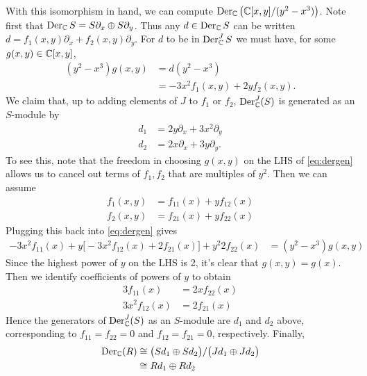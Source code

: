 \begin{example}
    With this isomorphism in hand, we can compute $\operatorname{Der}_{\mathbb{C}}\left( \mathbb{C}[x,y]/(y^2-x^3) \right)$.
    Note first that $\operatorname{Der}_{\mathbb{C}} S=S\partial_x\oplus S\partial_y$.
    Thus any $d\in\operatorname{Der}_{\mathbb{C}} S$ can
    be written $d=f_1(x,y)\partial_x+f_2(x,y)\partial_y$. For $d$ to be in $\operatorname{Der}_{\mathbb{C}}^JS$
    we must have, for some $g(x,y)\in\mathbb{C}[x,y]$,
    \begin{align}
		\label{eq:dergen}
        (y^2-x^3)g(x,y) &= d(y^2-x^3)\nonumber\\
        &= -3x^2f_1(x,y)+2yf_2(x,y). 
    \end{align}
    We claim that, up to adding elements of $J$ to $f_1$ or $f_2$, $\operatorname{Der}_{\mathbb{C}}^J(S)$ is generated as 
		an $S$-module by
    \begin{align*}
        d_1 &= 2y\partial_x + 3x^2\partial_y\\
        d_2 &= 2x\partial_x+3y\partial_y.
    \end{align*}
		To see this, note that the freedom in choosing $g(x,y)$ on the LHS of \ref{eq:dergen} allows us
		to cancel out terms of $f_1, f_2$ that are multiples of $y^2$. Then we can assume
		\begin{align*}
		f_1(x,y) &= f_{11}(x) + y f_{12}(x) \\
		f_2(x,y) &= f_{21}(x) + y f_{22}(x)
		\end{align*}
		Plugging this back into \ref{eq:dergen} gives
		\begin{align*}
		-3x^2 f_{11}(x) + y \big[ - 3x^2f_{12}(x) + 2f_{21}(x) \big] + y^2 2f_{22}(x) &= (y^2 - x^3) g(x,y)
		\end{align*}
		Since the highest power of $y$ on the LHS is 2, it's clear that $g(x,y) = g(x)$. Then we identify 
		coefficients of powers of $y$ to obtain
		\begin{align*}
		3 f_{11}(x) &= 2x f_{22}(x) \\
		3x^2f_{12}(x) &= 2f_{21}(x)
		\end{align*}
		Hence the generators of $\operatorname{Der}_{\mathbb{C}}^J(S)$ as an $S$-module are $d_1$ and $d_2$ above, corresponding to 
		$f_{11} = f_{22} = 0$ and $f_{12} = f_{21} = 0$, respectively. Finally, 
		\begin{align*}
		\operatorname{Der}_{\mathbb{C}}(R) &\cong \big( S d_1 \oplus S d_2 \big) / \big(J d_1 \oplus J d_2 \big) \\
		&\cong R d_1 \oplus R d_2
		\end{align*}


\end{example}
